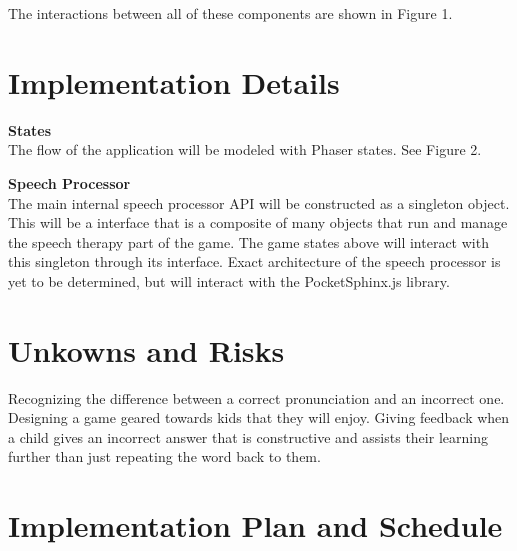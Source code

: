 \documentclass{article}
\begin{document}
The interactions between all of these components are shown in Figure 1.

\section{Implementation Details}

\textbf{States}\\
The flow of the application will be modeled with Phaser states. See Figure 2.

\textbf{Speech Processor}\\
The main internal speech processor API will be constructed as a singleton object. This will be a interface that is a composite of many objects that run and manage the speech therapy part of the game. The game states above will interact with this singleton through its interface. Exact architecture of the speech processor is yet to be determined, but will interact with the PocketSphinx.js library.

\section{Unkowns and Risks}

Recognizing the difference between a correct pronunciation and an incorrect one. Designing a game geared towards kids that they will enjoy. Giving feedback when a child gives an incorrect answer that is constructive and assists their learning further than just repeating the word back to them.

\section{Implementation Plan and Schedule}
\end{document}
